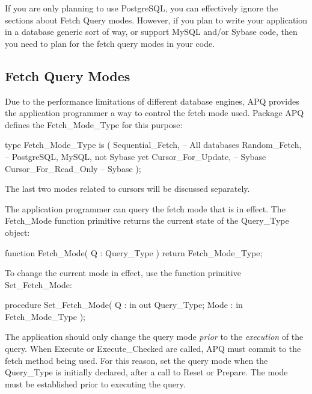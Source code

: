 \documentclass[english,letterpaper]{book}
\begin{document}
If you are only planning to use PostgreSQL, you can effectively ignore
the sections about Fetch Query modes. However, if you plan to write
your application in a database generic sort of way, or support MySQL
and/or Sybase code, then you need to plan for the fetch query modes
in your code.


\subsection{Fetch Query Modes\label{Fetch Query Modes}}

Due to the performance limitations of different database engines,
APQ provides the application programmer a way to control the fetch
mode used. Package APQ defines the Fetch\_Mode\_Type for this purpose:

\begin{Code}
type Fetch_Mode_Type is (
   Sequential_Fetch,    -- All databases
   Random_Fetch,        -- PostgreSQL, MySQL, not Sybase yet
   Cursor_For_Update,   -- Sybase
   Cursor_For_Read_Only -- Sybase
);
\end{Code}

The last two modes related to cursors will be discussed separately.

The application programmer can query the fetch mode that is in effect.
The Fetch\-\_Mode function primitive returns the current state
of the Query\-\_Type object:

\begin{Code}
function Fetch_Mode(
   Q : Query_Type
) return Fetch_Mode_Type;
\end{Code}

To change the current mode in effect, use the function primitive Set\_Fetch\_Mode:

\begin{Code}
procedure Set_Fetch_Mode(
   Q :    in out Query_Type;
   Mode : in     Fetch_Mode_Type
);
\end{Code}

The application should only change the query mode \emph{prior} to
the \emph{execution} of the query. When Execute or Execute\_Checked
are called, APQ must commit to the fetch method being used. For this
reason, set the query mode when the Query\_Type is initially declared,
after a call to Reset or Prepare. The mode must
be established prior to executing the query.
\end{document}
